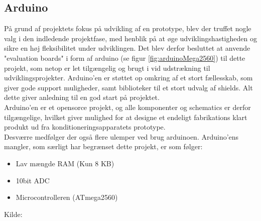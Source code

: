 \subsection{Arduino}
\begin{minipage}[t]{0.6\textwidth}
På grund af projektets fokus på udvikling af en prototype, blev der truffet nogle valg i den indledende projektfase, med henblik på at øge udviklingshastigheden og sikre en høj fleksibilitet under udviklingen. Det blev derfor besluttet at anvende "evaluation boards"  i form af arduino (se figur \ref{fig:arduinoMega2560}) til dette projekt, som netop er let tilgængelig og brugt i vid udstrækning til udviklingsprojekter. Arduino'en er støttet op omkring af et stort fællesskab, som giver gode support muligheder, samt biblioteker til et stort udvalg af shields. Alt dette giver anledning til en god start på projektet.\\

Arduino'en er et opensorce projekt, og alle komponenter og schematics er derfor tilgængelige, hvilket giver mulighed for at designe et endeligt fabrikations klart produkt ud fra konditioneringsapparatets prototype.\\

Desværre medfølger der også flere ulemper ved brug arduinoen. Arduino'ens mangler, som særligt har begrænset dette projekt, er som følger:\\

\begin{itemize}
	\item Lav mængde RAM (Kun 8 KB) 
	\item 10bit ADC
	\item Microcontrolleren (ATmega2560)
\end{itemize}
Kilde: \cite{RefWorks:40}

\end{minipage}
